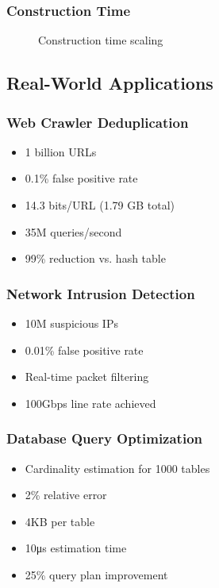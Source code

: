 \documentclass[11pt]{article}
\begin{document}
\subsubsection{Construction Time}

\begin{figure}[h]
\centering
{}
\caption{Construction time scaling}
\end{figure}

\subsection{Real-World Applications}

\subsubsection{Web Crawler Deduplication}
\begin{itemize}
\item 1 billion URLs
\item 0.1\% false positive rate
\item 14.3 bits/URL (1.79 GB total)
\item 35M queries/second
\item 99\% reduction vs. hash table
\end{itemize}

\subsubsection{Network Intrusion Detection}
\begin{itemize}
\item 10M suspicious IPs
\item 0.01\% false positive rate
\item Real-time packet filtering
\item 100Gbps line rate achieved
\end{itemize}

\subsubsection{Database Query Optimization}
\begin{itemize}
\item Cardinality estimation for 1000 tables
\item 2\% relative error
\item 4KB per table
\item 10μs estimation time
\item 25\% query plan improvement
\end{itemize}
\end{document}
